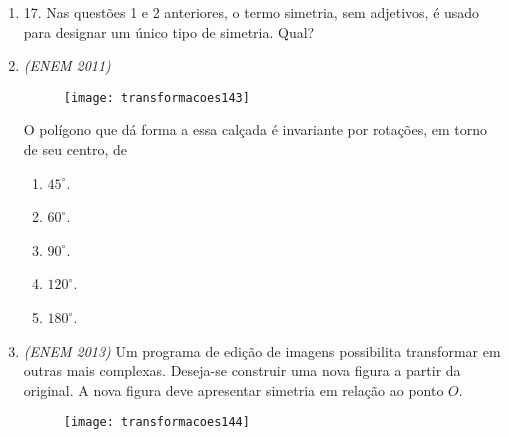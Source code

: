 \begin{enumerate}
\begin{multicols}{2}
\begin{enumerate}
\item {}
{
\texttt{[image: transformacoes139]}
}

\item {}
{
\texttt{[image: transformacoes140]}
}

\item {}
{
\texttt{[image: transformacoes141]}
}

\item {}
{
\texttt{[image: transformacoes142]}
}
\end{enumerate}
\end{multicols}

\item 17. Nas questões 1 e 2 anteriores, o termo simetria, sem adjetivos, é usado para designar um único tipo de simetria. Qual? 


\item \textit{(ENEM 2011)}
\begin{figure}[H]
\centering

\texttt{[image: transformacoes143]}
\end{figure}

O polígono que dá forma a essa calçada é invariante por rotações, em torno de seu centro, de
\begin{enumerate}
\item $45^{\circ}$.
\item $60^{\circ}$.
\item $90^{\circ}$.
\item $120^{\circ}$.
\item $180^{\circ}$.
\end{enumerate}

\item \textit{(ENEM 2013)} Um programa de edição de imagens possibilita transformar em outras mais complexas. Deseja-se construir uma nova figura a partir da original. A nova figura deve apresentar simetria em relação ao ponto $O$. 

\begin{figure}[H]
\centering

\texttt{[image: transformacoes144]}
\end{figure}


\end{enumerate}
